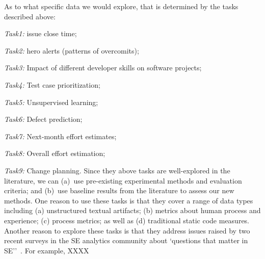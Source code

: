 As to what specific data we would explore, that is determined by the tasks described above:
\bi
\item {\em Task1:} issue close time;
\item  {\em Task2:} hero alerts (patterns of overcomits);
\item {\em Task3:} Impact of different developer skills on software projects;
\item {\em Task4:} Test case prioritization;
\item  {\em Task5:} Unsupervised learning;
\item  {\em Task6:} Defect prediction;
\item  {\em Task7:} Next-month effort estimates;
\item  {\em Task8:} Overall effort estimation;
\item  {\em Task9:} Change planning.
\ei
Since they above tasks are  well-explored in the literature, we can (a)~use pre-existing experimental methods and evaluation criteria; and (b)~use  baseline results  from the literature to 
assess   our new methods. 
One reason to use these tasks is that 
they cover a range of data types including (a) unstructured textual artifacts;  (b) metrics about human process and experience; (c) process metrics; as well as (d) traditional static code measures.
Another reason to explore these tasks is that 
they address
issues raised by two recent surveys in the SE analytics community
about  `questions that matter in SE''~\cite{Begel:2014,gupta2015identifying}.
For example, XXXX








